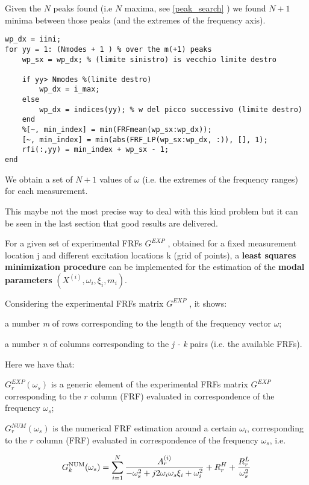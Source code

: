 \documentclass[a4paper,12pt,oneside]{article}
\begin{document}
Given the $N$ peaks found (i.e $N$ maxima, see \ref{peak_search} ) we found $N+1$ minima between those peaks (and the extremes of the frequency axis).

\begin{lstlisting}[caption = {Frequency range search}]
wp_dx = iini;
for yy = 1: (Nmodes + 1 ) % over the m(+1) peaks
    wp_sx = wp_dx; % (limite sinistro) is vecchio limite destro
    
    if yy> Nmodes %(limite destro)
        wp_dx = i_max;
    else
        wp_dx = indices(yy); % w del picco successivo (limite destro)
    end
    %[~, min_index] = min(FRFmean(wp_sx:wp_dx));
    [~, min_index] = min(abs(FRF_LP(wp_sx:wp_dx, :)), [], 1);
    rfi(:,yy) = min_index + wp_sx - 1;
end
\end{lstlisting}

We obtain a set of $N+1$ values of $\omega$
(i.e. the extremes of the frequency ranges) for each measurement.

This maybe not the most precise way to deal with this kind problem but it can be seen in the last section that good results are delivered.

For a given set of experimental FRFs $ G^{EXP} $ , obtained for a fixed measurement location j and different excitation locations k (grid of points), a \textbf{least squares minimization procedure} can be implemented for the estimation of the \textbf{modal parameters} $ ( X^{(i)} , \omega_i , \xi_i , m_i ) $.

Considering the experimental FRFs matrix $G^{EXP}$ , it shows:

\begin{list}{•}{}
\item a number \textit{m} of rows corresponding to the length of the frequency vector $\omega$;
\item a number \textit{n} of columns corresponding to the \textit{j - k} pairs (i.e. the available FRFs).
\end{list}

Here we have that:

\begin{list}{•}{}
\item $ G_r^{EXP} (\omega_s)$ is a generic element of the experimental FRFs matrix $ G^{EXP} $ corresponding to the $r$ column (FRF) evaluated in correspondence of the frequency $\omega_s$;
\item $ G_r^{NUM} (\omega_s)$ is the numerical FRF estimation around a certain $\omega_i$, corresponding to the $r$ column (FRF) evaluated in correspondence of the frequency $\omega_s$, i.e.

\[
	G^\textup{NUM}_k(\omega_s) = \sum_{i=1}^{N} \frac{ A_{r}^{(i)} }
		{-\omega_s^2 + j 2 \omega_i \omega_s \xi_i + \omega^2_i}
		+ R^H_{r} + \frac{R^L_{r}}{\omega_s^2}
\]
\end{list}
\end{document}
